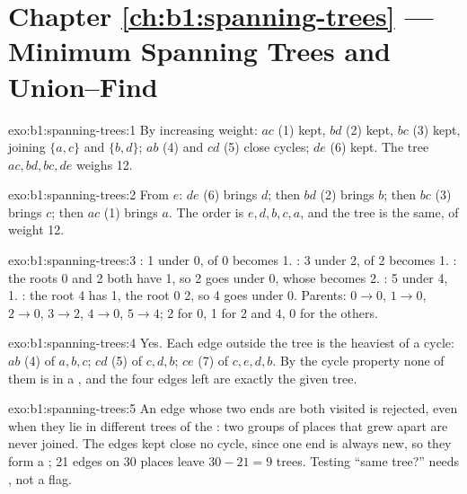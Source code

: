 \section*{Chapter \ref{ch:b1:spanning-trees} --- Minimum Spanning Trees and Union--Find}

\begin{solution}{exo:b1:spanning-trees:1}
By increasing weight: $ac$ (1) kept, $bd$ (2) kept, $bc$ (3) kept, joining $\{a, c\}$ and $\{b, d\}$; $ab$ (4) and $cd$ (5)
close cycles; $de$ (6) kept. The tree $ac, bd, bc, de$ weighs 12.
\end{solution}

\begin{solution}{exo:b1:spanning-trees:2}
From $e$: $de$ (6) brings $d$; then $bd$ (2) brings $b$; then $bc$ (3) brings $c$; then $ac$ (1) brings $a$. The order is
$e, d, b, c, a$, and the tree is the same, of weight 12.
\end{solution}

\begin{solution}{exo:b1:spanning-trees:3}
: 1 under 0,  of 0 becomes 1. : 3 under 2,  of 2 becomes 1. : the roots 0 and 2 both have  1, so 2 goes under 0, whose  becomes 2. : 5 under 4,  1.
: the root 4 has  1, the root 0  2, so 4 goes under 0. Parents: $0 \to 0$, $1 \to 0$, $2 \to
0$, $3 \to 2$, $4 \to 0$, $5 \to 4$;  2 for 0, 1 for 2 and 4, 0 for the others.
\end{solution}

\begin{solution}{exo:b1:spanning-trees:4}
Yes. Each edge outside the tree is the heaviest of a cycle: $ab$ (4) of $a, b, c$; $cd$ (5) of $c, d, b$; $ce$ (7) of $c,
e, d, b$. By the cycle property none of them is in a , and the four edges left are exactly the
given tree.
\end{solution}

\begin{solution}{exo:b1:spanning-trees:5}
An edge whose two ends are both visited is rejected, even when they lie in different trees of the : two groups of
places that grew apart are never joined. The edges kept close no cycle, since one end is always new, so they form a
; 21 edges on 30 places leave $30 - 21 = 9$ trees. Testing ``same tree?'' needs , not a flag.
\end{solution}

